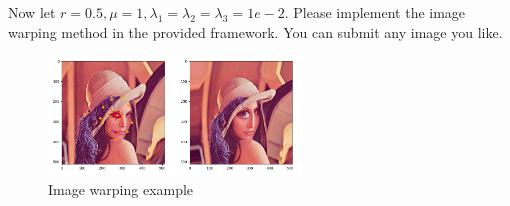 \documentclass[11pt,letter,notitlepage]{article}
\begin{document}
\begin{exercise}
\begin{enumerate}
    

    Now let $r=0.5, \mu=1, \lambda
    _1 = \lambda_2 = \lambda_3 = 1e-2$. Please implement the image warping method in the provided framework. You can submit any image you like.
\end{enumerate}
\end{exercise}
\begin{figure}[htbp]
    \centering
        \includegraphics[width=0.6\textwidth]{./Figure/HW2-example.png}
        \caption{Image warping example}
        \label{fig:image-warping}
\end{figure}

\newpage
\end{document}
